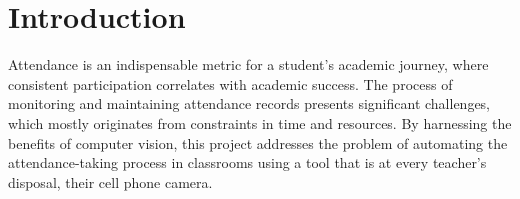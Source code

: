 \section{Introduction}
\label{sec:intro}

Attendance is an indispensable metric for a student's academic journey, where consistent participation correlates with academic success. The process of monitoring and maintaining attendance records presents significant challenges, which mostly originates from constraints in time and resources. By harnessing the benefits of computer vision, this project addresses the problem of automating the attendance-taking process in classrooms using a tool that is at every teacher’s disposal, their cell phone camera.
